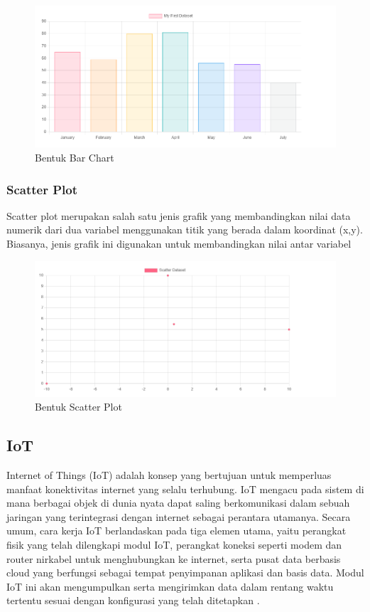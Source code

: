 \begin{figure}[H]
	\centering
	\includegraphics[width=0.8\linewidth]{gambar/Dasar teori/Bar Chart.png}
	\caption{Bentuk Bar Chart}
	\label{gambar1}
\end{figure}

\subsubsection{Scatter Plot}
Scatter plot merupakan salah satu jenis grafik yang membandingkan nilai data numerik dari dua variabel menggunakan titik yang berada dalam koordinat (x,y). Biasanya, jenis grafik ini digunakan untuk membandingkan nilai antar variabel \cite{ChartJs}

\begin{figure}[H]
	\centering
	\includegraphics[width=0.8\linewidth]{gambar/Dasar teori/scatter.png}
	\caption{Bentuk Scatter Plot}
	\label{gambar1}
\end{figure}

\subsection{IoT}
Internet of Things (IoT) adalah konsep yang bertujuan untuk memperluas manfaat konektivitas internet yang selalu terhubung. IoT mengacu pada sistem di mana berbagai objek di dunia nyata dapat saling berkomunikasi dalam sebuah jaringan yang terintegrasi dengan internet sebagai perantara utamanya. Secara umum, cara kerja IoT berlandaskan pada tiga elemen utama, yaitu perangkat fisik yang telah dilengkapi modul IoT, perangkat koneksi seperti modem dan router nirkabel untuk menghubungkan ke internet, serta pusat data berbasis cloud yang berfungsi sebagai tempat penyimpanan aplikasi dan basis data. Modul IoT ini akan mengumpulkan serta mengirimkan data dalam rentang waktu tertentu sesuai dengan konfigurasi yang telah ditetapkan \cite{Mykhailo2024}.

